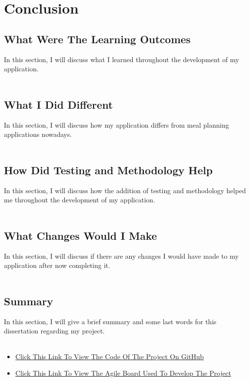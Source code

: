 \chapter{Conclusion}

\section{What Were The Learning Outcomes}

In this section, I will discuss what I learned throughout the development of my application.\\ \\

\section{What I Did Different}

In this section, I will discuss how my application differs from meal planning applications nowadays.\\ \\

\section{How Did Testing and Methodology Help}

In this section, I will discuss how the addition of testing and methodology helped me throughout the development of my application.\\ \\

\section{What Changes Would I Make}

In this section, I will discuss if there are any changes I would have made to my application after now completing it.\\ \\

\section{Summary}

In this section, I will give a brief summary and some last words for this dissertation regarding my project.\\ \\

\begin{appendices}
\begin{itemize}
\item \href{https://github.com/Emmanuel-Osabuehien/AppliedProjectMinorDissertation}{Click This Link To View The Code Of The Project On GitHub}
\item \href{https://g00373559.atlassian.net/jira/software/projects/MPRO/boards/4}{Click This Link To View The Agile Board Used To Develop The Project}
\end{itemize}
\end{appendices}